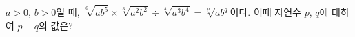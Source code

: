 $a>0$, $b>0$일 때, $\sqrt[6]{ab^5}\times\sqrt[3]{a^2b^2}\div\sqrt[4]{a^3b^4}=\sqrt[p]{ab^q}$이다. 이때 자연수 $p$, $q$에 대하여 $p-q$의 값은?
